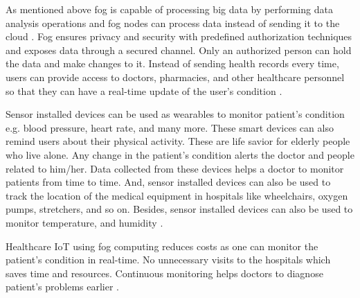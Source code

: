 As mentioned above fog is capable of processing big data by performing data analysis operations \cite{webpage} and fog nodes can process data instead of sending it to the cloud \cite{sandra}. Fog ensures privacy and security with predefined authorization techniques and exposes data through a secured channel. Only an authorized person can hold the data and make changes to it. Instead of sending health records every time, users can provide access to doctors, pharmacies, and other healthcare personnel so that they can have a real-time update of the user's condition \cite{jennifer}. \par

Sensor installed devices can be used as wearables to monitor patient's condition e.g. blood pressure, heart rate, and many more. These smart devices can also remind users about their physical activity. These are life savior for elderly people who live alone. Any change in the patient's condition alerts the doctor and people related to him/her. Data collected from these devices helps a doctor to monitor patients from time to time. And, sensor installed devices can also be used to track the location of the medical equipment in hospitals like wheelchairs, oxygen pumps, stretchers, and so on. Besides, sensor installed devices can also be used to monitor temperature, and humidity \cite{dr}. 

Healthcare IoT using fog computing reduces costs as one can monitor the patient's condition in real-time. No unnecessary visits to the hospitals which saves time and resources. Continuous monitoring helps doctors to diagnose patient's problems earlier \cite{dr}. 